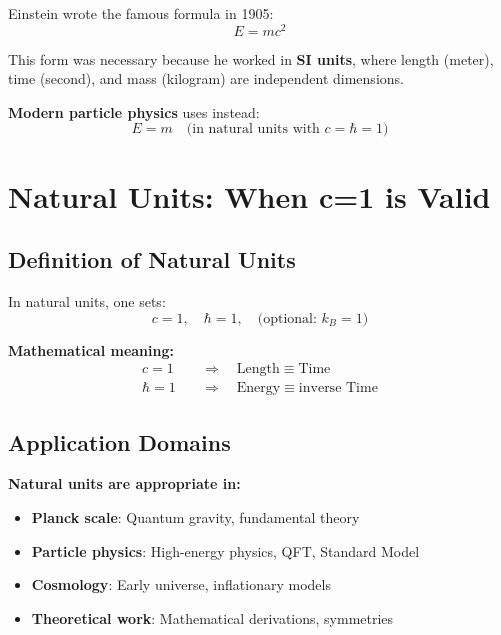 	Einstein wrote the famous formula in 1905:
	\begin{equation}
		E = mc^2
	\end{equation}
	
	This form was necessary because he worked in \textbf{SI units}, where length (meter), time (second), and mass (kilogram) are independent dimensions.
	
	\textbf{Modern particle physics} uses instead:
	\begin{equation}
		E = m \quad \text{(in natural units with } c=\hbar=1\text{)}
	\end{equation}
	
	\section{Natural Units: When c=1 is Valid}
	
	\subsection{Definition of Natural Units}
	
	In natural units, one sets:
	\begin{equation}
		c = 1, \quad \hbar = 1, \quad \text{(optional: } k_B = 1 \text{)}
	\end{equation}
	
	\textbf{Mathematical meaning:}
	\begin{align}
		c = 1 \quad &\Rightarrow \quad \text{Length} \equiv \text{Time} \\
		\hbar = 1 \quad &\Rightarrow \quad \text{Energy} \equiv \text{inverse Time}
	\end{align}
	
	\subsection{Application Domains}
	
	\textbf{Natural units are appropriate in:}
	
	\begin{itemize}
		\item \textbf{Planck scale}: Quantum gravity, fundamental theory
		\item \textbf{Particle physics}: High-energy physics, QFT, Standard Model
		\item \textbf{Cosmology}: Early universe, inflationary models
		\item \textbf{Theoretical work}: Mathematical derivations, symmetries
	\end{itemize}
	

